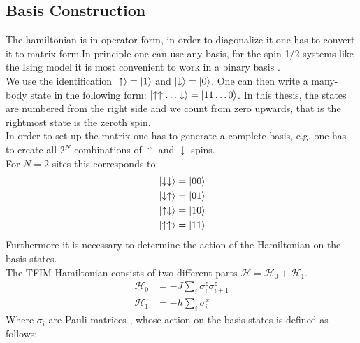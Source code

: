 \documentclass{article}
\begin{document}
\subsection{Basis Construction}
The hamiltonian is in operator form, in order to diagonalize it one
has to convert it to matrix form.In principle one can use any basis,
for the spin 1/2 systems like the Ising model it is most convenient to
work in a binary basis \cite{Noack,Laflorencie}.\\
We use the identification $\ket{\uparrow} = \ket{1}$ and $\ket{\downarrow} = \ket{0}$. One can then write a many-body state in the following form: $\ket{\uparrow \uparrow \dotso \downarrow} = \ket{11 \dotso 0}$. In this thesis, the states are numbered from the right side and we count from zero upwards, that is the rightmost state is the zeroth spin.\\
In order to set up the matrix one has to generate a complete basis, e.g. one has to create all 2$^{N}$ combinations of $\uparrow$ and $\downarrow$ spins.\\
For $N=2$ sites this corresponds to:
\begin{align*}
&\ket{\downarrow \downarrow} = \ket{00}\\
&\ket{\downarrow \uparrow} = \ket{01}\\
&\ket{\uparrow \downarrow} = \ket{10}\\
&\ket{\uparrow \uparrow} = \ket{11}\\
\end{align*}
Furthermore it is necessary to determine the action of the Hamiltonian on the basis states.\\
The TFIM Hamiltonian consists of two different parts $ \mathcal{H} = \mathcal{H}_0 + \mathcal{H}_1$.
\begin{align}
\label{eq:5}
\mathcal{H}_0 &= -J \sum\limits_{i}\sigma_i^z\sigma_{i+1}^z\\
\mathcal{H}_1 &= -h \sum\limits_i^{}\sigma_i^{x}
\end{align}
Where $\sigma_i$ are Pauli matrices , whose action on the basis states is defined as follows:
\end{document}
